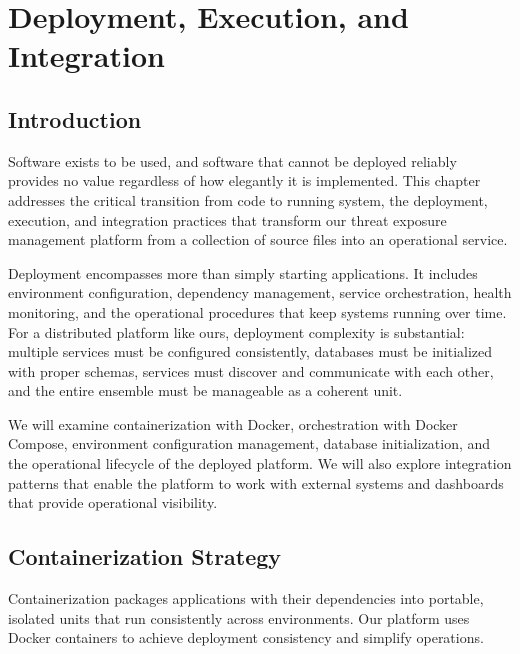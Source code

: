 \documentclass[a4paper,12pt]{report}
\begin{document}

\chapter{Deployment, Execution, and Integration}
\thispagestyle{plain}
\section*{Introduction}
Software exists to be used, and software that cannot be deployed reliably provides no value regardless of how elegantly it is implemented. This chapter addresses the critical transition from code to running system, the deployment, execution, and integration practices that transform our threat exposure management platform from a collection of source files into an operational service.\hfill \break

Deployment encompasses more than simply starting applications. It includes environment configuration, dependency management, service orchestration, health monitoring, and the operational procedures that keep systems running over time. For a distributed platform like ours, deployment complexity is substantial: multiple services must be configured consistently, databases must be initialized with proper schemas, services must discover and communicate with each other, and the entire ensemble must be manageable as a coherent unit.\hfill \break

We will examine containerization with Docker, orchestration with Docker Compose, environment configuration management, database initialization, and the operational lifecycle of the deployed platform. We will also explore integration patterns that enable the platform to work with external systems and dashboards that provide operational visibility.

\section{Containerization Strategy}

Containerization packages applications with their dependencies into portable, isolated units that run consistently across environments. Our platform uses Docker containers to achieve deployment consistency and simplify operations.
\end{document}
